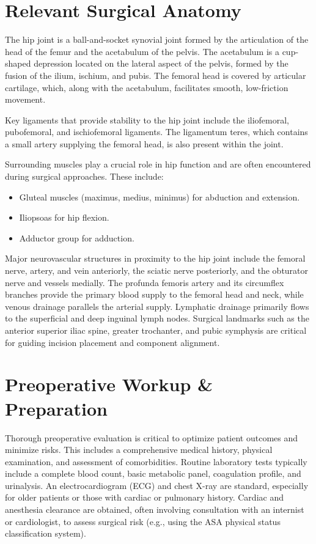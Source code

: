 \section*{Relevant Surgical Anatomy}
The hip joint is a ball-and-socket synovial joint formed by the articulation of the head of the femur and the acetabulum of the pelvis. The acetabulum is a cup-shaped depression located on the lateral aspect of the pelvis, formed by the fusion of the ilium, ischium, and pubis. The femoral head is covered by articular cartilage, which, along with the acetabulum, facilitates smooth, low-friction movement. 

Key ligaments that provide stability to the hip joint include the iliofemoral, pubofemoral, and ischiofemoral ligaments. The ligamentum teres, which contains a small artery supplying the femoral head, is also present within the joint. 

Surrounding muscles play a crucial role in hip function and are often encountered during surgical approaches. These include:
\begin{itemize}
  \item Gluteal muscles (maximus, medius, minimus) for abduction and extension.
  \item Iliopsoas for hip flexion.
  \item Adductor group for adduction.
\end{itemize}

Major neurovascular structures in proximity to the hip joint include the femoral nerve, artery, and vein anteriorly, the sciatic nerve posteriorly, and the obturator nerve and vessels medially. The profunda femoris artery and its circumflex branches provide the primary blood supply to the femoral head and neck, while venous drainage parallels the arterial supply. Lymphatic drainage primarily flows to the superficial and deep inguinal lymph nodes. Surgical landmarks such as the anterior superior iliac spine, greater trochanter, and pubic symphysis are critical for guiding incision placement and component alignment.

\section*{Preoperative Workup \& Preparation}
Thorough preoperative evaluation is critical to optimize patient outcomes and minimize risks. This includes a comprehensive medical history, physical examination, and assessment of comorbidities. Routine laboratory tests typically include a complete blood count, basic metabolic panel, coagulation profile, and urinalysis. An electrocardiogram (ECG) and chest X-ray are standard, especially for older patients or those with cardiac or pulmonary history. Cardiac and anesthesia clearance are obtained, often involving consultation with an internist or cardiologist, to assess surgical risk (e.g., using the ASA physical status classification system).

